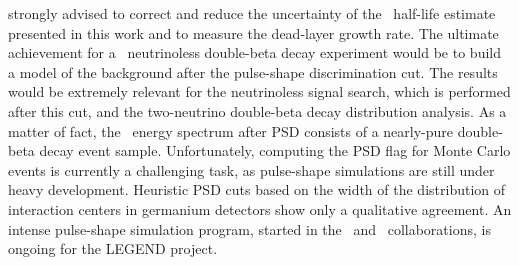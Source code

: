 strongly advised to correct and reduce the uncertainty of the \nnbb\ half-life estimate
presented in this work and to measure the dead-layer growth rate.
\newpar
The ultimate achievement for a \gesix\ neutrinoless double-beta decay experiment would be
to build a model of the background after the pulse-shape discrimination cut. The results
would be extremely relevant for the neutrinoless signal search, which is performed after
this cut, and the two-neutrino double-beta decay distribution analysis. As a matter of
fact, the \gerda\ energy spectrum after PSD consists of a nearly-pure double-beta decay
event sample. Unfortunately, computing the PSD flag for Monte Carlo events is currently a
challenging task, as pulse-shape simulations are still under heavy development. Heuristic
PSD cuts based on the width of the distribution of interaction centers in germanium
detectors show only a qualitative agreement. An intense pulse-shape simulation program,
started in the \gerda\ and \majorana\ collaborations, is ongoing for the LEGEND project.

\chapendgliph{}

